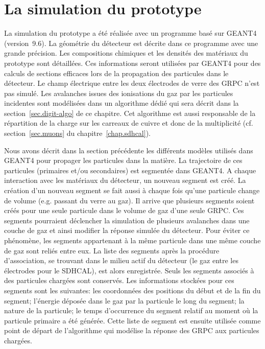 \section{La simulation du prototype}
La simulation du prototype a été réalisée avec un programme basé sur GEANT4 (version~9.6). La géométrie du détecteur est décrite dans ce programme avec une grande précision. Les compositions chimiques et les densités des matériaux du prototype sont détaillées. Ces informations seront utilisées par GEANT4 pour des calculs de sections efficaces lors de la propagation des particules dans le détecteur. Le champ électrique entre les deux électrodes de verre des GRPC n'est pas simulé. Les avalanches issues des ionisations du gaz par les particules incidentes sont modélisées dans un algorithme dédié qui sera décrit dans la section~\ref{sec.digit-algo} de ce chapitre. Cet algorithme est aussi responsable de la répartition de la charge sur les carreaux de cuivre et donc de la multiplicité (cf. section~\ref{sec.muons} du chapitre~\ref{chap.sdhcal}). 

Nous avons décrit dans la section précédente les différents modèles utilisés dans GEANT4 pour propager les particules dans la matière. La trajectoire de ces particules (primaires et/ou secondaires) est segmentée dans GEANT4. A chaque interaction avec les matériaux du détecteur, un nouveau segment est créé. La création d'un nouveau segment se fait aussi à chaque fois qu'une particule change de volume (e.g. passant du verre au gaz). Il arrive que plusieurs segments soient créés pour une seule particule dans le volume de gaz d'une seule GRPC. Ces segments pourraient déclencher la simulation de plusieurs avalanches dans une couche de gaz et ainsi modifier la réponse simulée du détecteur. Pour éviter ce phénomène, les segments appartenant à la même particule dans une même couche de gaz sont reliés entre eux.
La liste des segments après la procédure d'association, se trouvant dans le milieu actif du détecteur (le gaz entre les électrodes pour le SDHCAL), est alors enregistrée. Seuls les segments associés à des particules chargées sont conservés. Les informations stockées pour ces segments sont les suivantes: les coordonnées des positions du début et de la fin du segment; l'énergie déposée dans le gaz par la particule le long du segment; la nature de la particule; le temps d’occurrence du segment relatif au moment où la particule primaire a été générée. 
Cette liste de segment est ensuite utilisée comme point de départ de l’algorithme qui modélise la réponse des GRPC aux particules chargées.

